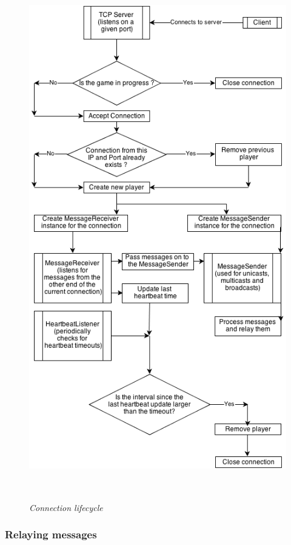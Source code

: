 \begin{figure}
\includegraphics[height=9.00in,width=5.00in]{./images/diagrams/connection_lifecycle.png}  
\caption{\small \sl Connection lifecycle \label{fig:connectionLifecycle}}
\end{figure}

\subsubsection{Relaying messages}

